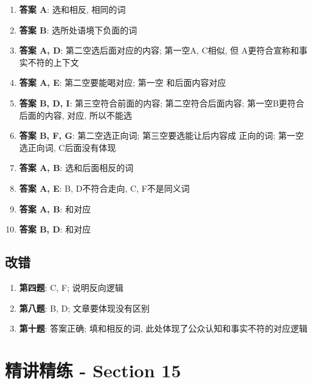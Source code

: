   \begin{enumerate}
    \item \textbf{答案 A}: 选和相反, 相同的词
    \item \textbf{答案 B}: 选所处语境下负面的词
    \item \textbf{答案 A, D}: 第二空选后面对应的内容; 第一空A, C相似, 但
    A更符合宣称和事实不符的上下文
    \item \textbf{答案 A, E}: 第二空要能喝对应; 第一空
    和后面内容对应
    \item \textbf{答案 B, D, I}: 第三空符合前面的内容; 第二空符合后面内容; 第一空B更符合
    后面的内容, 对应, 所以不能选
    \item \textbf{答案 B, F, G}: 第二空选正向词; 第三空要选能让后内容成
    正向的词; 第一空选正向词, C后面没有体现
    \item \textbf{答案 A, B}: 选和后面相反的词
    \item \textbf{答案 A, E}: B, D不符合走向, C, F不是同义词
    \item \textbf{答案 A, B}: 和对应
    \item \textbf{答案 B, D}: 和对应
  \end{enumerate}

  \subsection{改错}

    \begin{enumerate}
      \item \textbf{第四题}: C, F; 说明反向逻辑
      \item \textbf{第八题}: B, D; 文章要体现没有区别
      \item \textbf{第十题}: 答案正确; 填和相反的词,
      此处体现了公众认知和事实不符的对应逻辑
    \end{enumerate}

\section{精讲精练 - Section 15}

